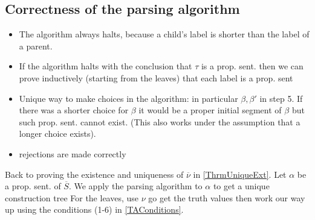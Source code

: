 \subsection*{Correctness of the parsing algorithm}
\begin{itemize}
    \item The algorithm always halts, because a child's label is shorter than the label of a parent.
    \item If the algorithm halts with the conclusion that $\tau$ is a prop. sent. 
    then we can prove inductively (starting from the leaves) that each label is a prop. sent
    \item Unique way to make choices in the algorithm: in particular $\beta, \beta'$ in step 5.
    If there was a shorter choice for $\beta$ it would be a proper initial segment of $\beta$ but such prop. sent. cannot exist.
    (This also works under the assumption that a longer choice exists).
    \item rejections are made correctly
\end{itemize}



Back to proving the existence and uniqueness of $\overline{\nu}$ in \ref{ThrmUniqueExt}.
Let $\alpha$ be a prop. sent. of $\overline{S}$. We apply the parsing algorithm to $\alpha$ to get a unique construction tree
For the leaves, use $\nu$ go get the truth values then work our way up using the conditions (1-6) in \ref{TAConditions}.
